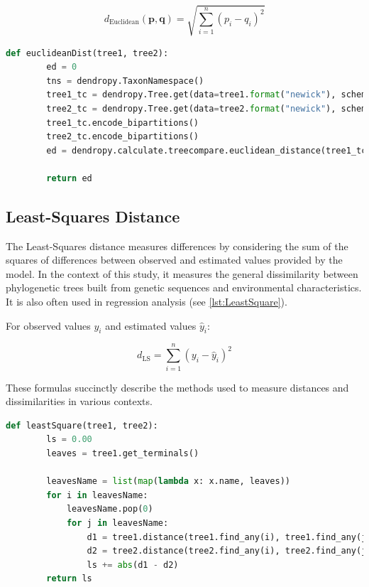 \begin{equation}
    d_{\text{Euclidean}}(\mathbf{p}, \mathbf{q}) = \sqrt{\sum_{i=1}^{n} (p_i - q_i)^2}
\end{equation}

\begin{lstlisting}[label=lst:euclideanDist,language=Python,caption=Python script for calculating the Euclidean distance using the ete3 package in the aPhyloGeo package]
    def euclideanDist(tree1, tree2):
        ed = 0
        tns = dendropy.TaxonNamespace()
        tree1_tc = dendropy.Tree.get(data=tree1.format("newick"), schema="newick", taxon_namespace=tns)
        tree2_tc = dendropy.Tree.get(data=tree2.format("newick"), schema="newick", taxon_namespace=tns)
        tree1_tc.encode_bipartitions()
        tree2_tc.encode_bipartitions()
        ed = dendropy.calculate.treecompare.euclidean_distance(tree1_tc, tree2_tc)

        return ed
\end{lstlisting}

\subsection{Least-Squares Distance}\label{LS}
The Least-Squares distance measures differences by considering the sum of the squares of differences between observed and estimated values provided by the model. In the context of this study, it measures the general dissimilarity between phylogenetic trees built from genetic sequences and environmental characteristics. It is also often used in regression analysis (see \autoref{lst:LeastSquare}).

For observed values $y_i$ and estimated values $\hat{y}_i$:

\begin{equation}
    d_{\text{LS}} = \sum_{i=1}^{n} (y_i - \hat{y}_i)^2
\end{equation}

These formulas succinctly describe the methods used to measure distances and dissimilarities in various contexts.

\begin{lstlisting}[label=lst:LeastSquare,language=Python,caption=Python script for calculating the Least-Square distance using the ete3 package in the aPhyloGeo package]
    def leastSquare(tree1, tree2):
        ls = 0.00
        leaves = tree1.get_terminals()

        leavesName = list(map(lambda x: x.name, leaves))
        for i in leavesName:
            leavesName.pop(0)
            for j in leavesName:
                d1 = tree1.distance(tree1.find_any(i), tree1.find_any(j))
                d2 = tree2.distance(tree2.find_any(i), tree2.find_any(j))
                ls += abs(d1 - d2)
        return ls
\end{lstlisting}

